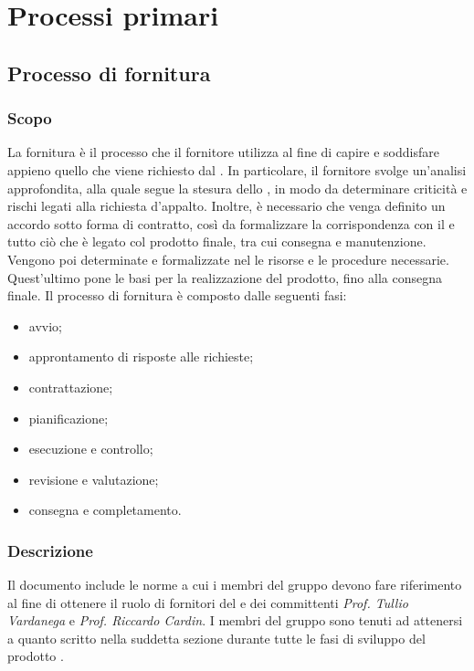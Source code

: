 \section{Processi primari}
\subsection{Processo di fornitura}
\subsubsection{Scopo}
La fornitura è il processo che il fornitore utilizza al fine di capire e soddisfare appieno quello che viene richiesto dal .  In particolare,  il fornitore svolge un'analisi approfondita,  alla quale segue la stesura dello \SdF{}, in modo da determinare criticità e rischi legati alla richiesta d'appalto. Inoltre, è necessario che venga definito un accordo sotto forma di contratto, così da formalizzare la corrispondenza con il  e tutto ciò che è legato col prodotto finale, tra cui consegna e manutenzione. Vengono poi determinate e formalizzate nel \PdP{} le risorse e le procedure necessarie. Quest'ultimo pone le basi per la realizzazione del prodotto, fino alla consegna finale.\newline 
Il processo di fornitura è composto dalle seguenti fasi:
\begin{itemize}
	\item avvio;
	\item approntamento di risposte alle richieste;
	\item contrattazione;
	\item pianificazione;
	\item esecuzione e controllo;
	\item revisione e valutazione;
	\item consegna e completamento.
\end{itemize}
\subsubsection{Descrizione}
Il documento include le norme a cui i membri del gruppo \Gruppo{} devono fare riferimento al fine di ottenere il ruolo di fornitori del  \proponente{} e dei committenti \textit{Prof. Tullio Vardanega} e \textit{Prof. Riccardo Cardin}. I membri del gruppo sono tenuti ad attenersi a quanto scritto nella suddetta sezione durante tutte le fasi di sviluppo del prodotto \progetto{}.
